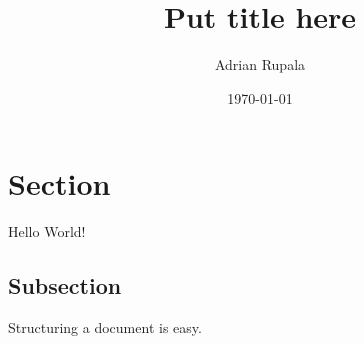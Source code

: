 \documentclass{article}
\title{~Put title here~}
\date{\today}
\author{Adrian Rupala}
\begin{document}
	\maketitle
	\newpage
	
	\section{Section}
	Hello World!
	
	\subsection{Subsection}
	Structuring a document is easy.
\end{document}
